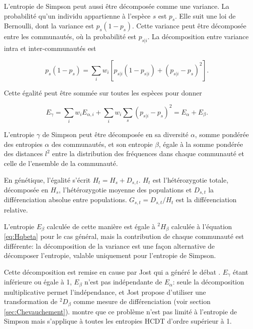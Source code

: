 \documentclass[
  11pt,
  french,
  a4paper,
  extrafontsizes,onecolumn,openright
  ]{memoir}
\begin{document}
L'entropie de Simpson peut aussi être décomposée comme une variance.
La probabilité qu'un individu appartienne à l'espèce \(s\) est \(p_s\).
Elle suit une loi de Bernoulli, dont la variance est \(p_s\left(1-p_s\right)\).
Cette variance peut être décomposée entre les communautés, où la probabilité est \(p_{s|i}\).
La décomposition entre variance intra et inter-communautés est

\begin{equation}
  \label{eq:DecSimpsons}
  p_s\left(1-p_s\right)=\sum_i{w_i\left[p_{s|i}\left(1-p_{s|i}\right)+{\left(p_{s|i}-p_s\right)}^2\right]}.
\end{equation}

Cette égalité peut être sommée sur toutes les espèces pour donner

\begin{equation}
  \label{eq:SimpsonNei}
  E_{\gamma}=\sum_i{w_i E_{\alpha,i}}+\sum_i{w_i\sum_s{{\left(p_{s|i}-p_s\right)}^2}}=E_{\alpha}+E_{\beta}.
\end{equation}

L'entropie \(\gamma\) de Simpson peut être décomposée en sa diversité \(\alpha\), somme pondérée des entropies \(\alpha\) des communautés, et son entropie \(\beta\), égale à la somme pondérée des distances \(l^2\) entre la distribution des fréquences dans chaque communauté et celle de l'ensemble de la communauté.

En génétique, l'égalité s'écrit\autocite{Nei1973} \(H_t=H_s+D_{s,t}\).
\(H_t\) est l'hétérozygotie totale, décomposée en \(H_s\), l'hétérozygotie moyenne des populations et \(D_{s,t}\) la différenciation absolue entre populations.
\(G_{s,t}={D_{s,t}}/{H_t}\) est la différenciation relative.

L'entropie \(E_{\beta}\) calculée de cette manière est égale à \(^{2}\!H_{\beta}\) calculée à l'équation \eqref{eq:Hqbeta} pour le cas général, mais la contribution de chaque communauté est différente: la décomposition de la variance est une façon alternative de décomposer l'entropie, valable uniquement pour l'entropie de Simpson.

Cette décomposition est remise en cause par Jost \autocite{Jost2007,Jost2008} qui a généré le débat \autocite{Heller2009,Ryman2009,Jost2009a,Whitlock2011}.
\(E_{\gamma}\) étant inférieure ou égale à 1, \(E_{\beta}\) n'est pas indépendante de \(E_{\alpha}\): seule la décomposition multiplicative permet l'indépendance, et Jost propose d'utiliser une transformation de \(^{2}\!D_{\beta}\) comme mesure de différenciation (voir section \ref{sec:Chevauchement}). \textcite{Gregorius2014} montre que ce problème n'est pas limité à l'entropie de Simpson mais s'applique à toutes les entropies HCDT d'ordre supérieur à 1.
\end{document}
